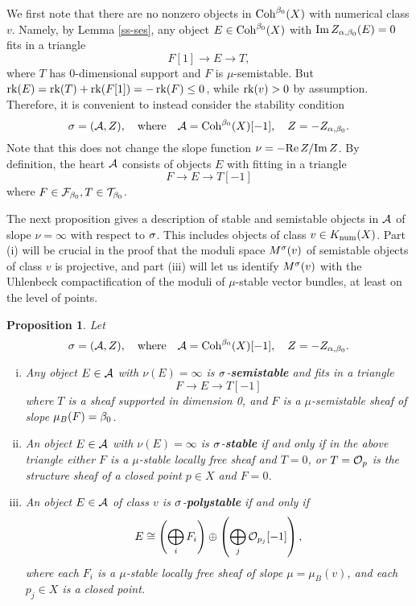 \documentclass[letterpaper,12pt]{amsart}
\newtheorem{prop}[thm]{Proposition}
\theoremstyle{remark}
\begin{document}
We first note that there are no nonzero objects in $\mathrm{Coh}^{\beta_0}(X)$ with numerical class $v$. Namely, by Lemma \ref{ss-ses}, any object $E \in \mathrm{Coh}^{\beta_0}(X)$ with $\mathrm{Im}\, Z_{\alpha,\beta_0}(E) = 0$ fits in a triangle
\[ F[1] \to E \to T, \]
where $T$ has 0-dimensional support and $F$ is $\mu$-semistable. But $\operatorname{\mathrm{rk}}(E) = \operatorname{\mathrm{rk}}(T) + \operatorname{\mathrm{rk}}(F[1]) = -\operatorname{\mathrm{rk}}(F) \le 0$, while $\operatorname{\mathrm{rk}}(v) > 0$ by assumption. Therefore, it is convenient to instead consider the stability condition 
\[ \sigma = (\mathcal{A}, Z), \quad \mathrm{where} \quad \mathcal{A} = \mathrm{Coh}^{\beta_0}(X)[-1], \quad Z = -Z_{\alpha,\beta_0}. \] 
Note that this does not change the slope function $\nu = -\mathrm{Re}\, Z/\mathrm{Im}\, Z$. By definition, the heart $\mathcal{A}$ consists of objects $E$ with fitting in a triangle
\[ F \to E \to T[-1] \]
where $F \in \mathcal{F}_{\beta_0}, T \in \mathcal{T}_{\beta_0}$.

The next proposition gives a description of stable and semistable objects in $\mathcal{A}$ of slope $\nu = \infty$ with respect to $\sigma$. This includes objects of class $v \in K_{\mathrm{num}}(X)$. Part (i) will be crucial in the proof that the moduli space $M^\sigma(v)$ of semistable objects of class $v$ is projective, and part (iii) will let us identify $M^\sigma(v)$ with the Uhlenbeck compactification of the moduli of $\mu$-stable vector bundles, at least on the level of points.
\begin{prop}\label{ss-object-vertical-classification}
    Let 
    \[ \sigma = (\mathcal{A}, Z), \quad \mathrm{where} \quad \mathcal{A} = \mathrm{Coh}^{\beta_0}(X)[-1], \quad Z = -Z_{\alpha,\beta_0}. \]
    \begin{enumerate}[(i)]
        \item Any object $E \in \mathcal{A}$ with $\nu(E) = \infty$ is $\sigma$-{\bf semistable} and fits in a triangle
        \[ F \to E \to T[-1] \]
        where $T$ is a sheaf supported in dimension 0, and $F$ is a $\mu$-semistable sheaf of slope $\mu_B(F) = \beta_0$. 
        \item An object $E \in \mathcal{A}$ with $\nu(E) = \infty$ is $\sigma$-{\bf stable} if and only if in the above triangle either $F$ is a $\mu$-stable locally free sheaf and $T = 0$, or $T = \mathcal{O}_p$ is the structure sheaf of a closed point $p \in X$ and $F = 0$.
        \item An object $E \in \mathcal{A}$ of class $v$ is $\sigma$-{\bf polystable} if and only if
        \[ E \cong \left(\bigoplus_i F_i\right) \oplus \left(\bigoplus_j \mathcal{O}_{p_j}[-1]\right), \]
        where each $F_i$ is a $\mu$-stable locally free sheaf of slope $\mu = \mu_B(v)$, and each $p_j \in X$ is a closed point.
    \end{enumerate}
\end{prop}
\end{document}
